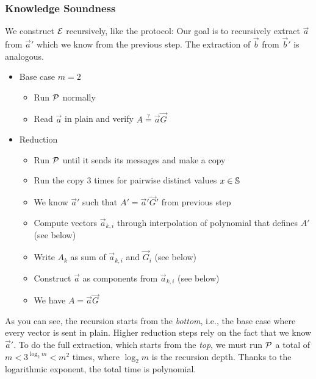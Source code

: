 \subsubsection{Knowledge Soundness}

We construct $\mathcal{E}$ recursively,
like the protocol:
Our goal is to recursively extract $\vec{a}$ from $\vec{a}'$ which we know from the previous step.
%
The extraction of $\vec{b}$ from $\vec{b}'$ is analogous.
%
\begin{itemize}
    \item Base case $m = 2$
        \begin{itemize}
            \item Run $\mathcal{P}$ normally
            \item Read $\vec{a}$ in plain and verify $A \overset{?}{=} \vec{a}\vec{G}$
        \end{itemize}
    \item Reduction
        \begin{itemize}
            \item Run $\mathcal{P}$ until it sends its messages and make a copy
            \item Run the copy $3$ times for pairwise distinct values $x \in \mathbb{S}$
            \item We know $\vec{a}'$ such that $A' = \vec{a}'\vec{G}'$ from previous step
            \item Compute vectors $\vec{a}_{k, i}$ through interpolation of polynomial that defines $A'$ (see below)
            \item Write $A_k$ as sum of $\vec{a}_{k, i}$ and $\vec{G}_i$ (see below)
            \item Construct $\vec{a}$ as components from $\vec{a}_{k, i}$ (see below)
            \item We have $A = \vec{a}\vec{G}$
        \end{itemize}
\end{itemize}
%
As you can see, the recursion starts from the \emph{bottom}, i.e.,
the base case where every vector is sent in plain.
Higher reduction steps rely on the fact that we know $\vec{a}'$.
To do the full extraction, which starts from the \emph{top},
we must run $\mathcal{P}$ a total of $m < 3^{\log_2 m} < m^2$ times,
where $\log_2 m$ is the recursion depth.
Thanks to the logarithmic exponent, the total time is polynomial.

